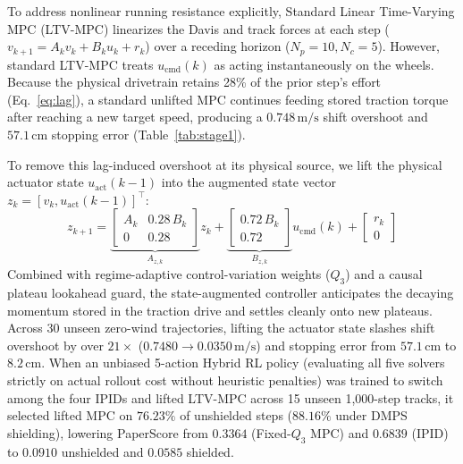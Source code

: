 \documentclass[10pt,a4paper]{article}
\begin{document}
To address nonlinear running resistance explicitly, Standard Linear Time-Varying MPC (LTV-MPC) \cite{ref2} linearizes the Davis and track forces at each step ($v_{k+1} = A_k v_k + B_k u_k + r_k$) over a receding horizon ($N_p = 10, N_c = 5$). However, standard LTV-MPC treats $u_{\text{cmd}}(k)$ as acting instantaneously on the wheels. Because the physical drivetrain retains 28\% of the prior step's effort (Eq.~\ref{eq:lag}), a standard unlifted MPC continues feeding stored traction torque after reaching a new target speed, producing a $0.748\,\text{m/s}$ shift overshoot and $57.1\,\text{cm}$ stopping error (Table~\ref{tab:stage1}).

To remove this lag-induced overshoot at its physical source, we lift the physical actuator state $u_{\text{act}}(k-1)$ into the augmented state vector $z_k = [v_k, u_{\text{act}}(k-1)]^\top$:
\begin{equation}
z_{k+1} = \underbrace{\begin{bmatrix} A_k & 0.28\,B_k \\ 0 & 0.28 \end{bmatrix}}_{A_{z,k}} z_k + \underbrace{\begin{bmatrix} 0.72\,B_k \\ 0.72 \end{bmatrix}}_{B_{z,k}} u_{\text{cmd}}(k) + \begin{bmatrix} r_k \\ 0 \end{bmatrix}
\label{eq:lifted}
\end{equation}
Combined with regime-adaptive control-variation weights ($Q_3$) and a causal plateau lookahead guard, the state-augmented controller anticipates the decaying momentum stored in the traction drive and settles cleanly onto new plateaus. Across 30 unseen zero-wind trajectories, lifting the actuator state slashes shift overshoot by over $21\times$ ($0.7480 \to 0.0350\,\text{m/s}$) and stopping error from $57.1\,\text{cm}$ to $8.2\,\text{cm}$. When an unbiased 5-action Hybrid RL policy (evaluating all five solvers strictly on actual rollout cost without heuristic penalties) was trained to switch among the four IPIDs and lifted LTV-MPC across 15 unseen 1,000-step tracks, it selected lifted MPC on $76.23\%$ of unshielded steps ($88.16\%$ under DMPS shielding), lowering PaperScore from $0.3364$ (Fixed-$Q_3$ MPC) and $0.6839$ (IPID) to $0.0910$ unshielded and $0.0585$ shielded.
\end{document}
